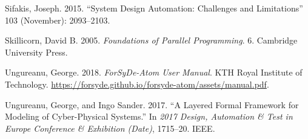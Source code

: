 \documentclass[
  a4paper,
]{article}
\begin{document}
\leavevmode\hypertarget{ref-Sifakis15}{}%
Sifakis, Joseph. 2015. ``System Design Automation: Challenges and
Limitations'' 103 (November): 2093--2103.

\leavevmode\hypertarget{ref-skillicorn05}{}%
Skillicorn, David B. 2005. \emph{Foundations of Parallel Programming}.
6. Cambridge University Press.

\leavevmode\hypertarget{ref-atom-manual}{}%
Ungureanu, George. 2018. \emph{ForSyDe-Atom User Manual}. KTH Royal
Institute of Technology.
\url{https://forsyde.github.io/forsyde-atom/assets/manual.pdf}.

\leavevmode\hypertarget{ref-ungureanu17}{}%
Ungureanu, George, and Ingo Sander. 2017. ``A Layered Formal Framework
for Modeling of Cyber-Physical Systems.'' In \emph{2017 Design,
Automation \& Test in Europe Conference \& Exhibition (Date)}, 1715--20.
IEEE.
\end{document}
